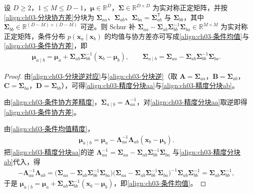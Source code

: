 \documentclass[../../main.tex]{subfiles}
\begin{document}
\begin{proposition}\label{proposition:ch03-条件Gauss协方差}
设 $D\geqslant2$，$1\leqslant M\leqslant D-1$，$\boldsymbol{\mu}\in\mathbb{R}^{D}$，$\boldsymbol{\Sigma}\in\mathbb{R}^{D\times D}$ 为实对称正定矩阵，并按\eqref{align:ch03-分块协方差}分块为 $\boldsymbol{\Sigma}_{aa}$、$\boldsymbol{\Sigma}_{ab}$、$\boldsymbol{\Sigma}_{ba}=\boldsymbol{\Sigma}_{ab}^{\mathsf{T}}$ 与 $\boldsymbol{\Sigma}_{bb}$，其中 $\boldsymbol{\Sigma}_{bb}\in\mathbb{R}^{(D-M)\times(D-M)}$ 可逆。则 Schur 补 $\boldsymbol{\Sigma}_{aa}-\boldsymbol{\Sigma}_{ab}\boldsymbol{\Sigma}_{bb}^{-1}\boldsymbol{\Sigma}_{ba}\in\mathbb{R}^{M\times M}$ 为实对称正定矩阵，条件分布 $p(\boldsymbol{x}_{a}\mid\boldsymbol{x}_{b})$ 的均值与协方差亦可写成\eqref{align:ch03-条件均值}与\eqref{align:ch03-条件协方差}，即
\begin{align*}
\boldsymbol{\mu}_{a\mid b}=\boldsymbol{\mu}_{a}+\boldsymbol{\Sigma}_{ab}\boldsymbol{\Sigma}_{bb}^{-1}(\boldsymbol{x}_{b}-\boldsymbol{\mu}_{b}),\qquad \boldsymbol{\Sigma}_{a\mid b}=\boldsymbol{\Sigma}_{aa}-\boldsymbol{\Sigma}_{ab}\boldsymbol{\Sigma}_{bb}^{-1}\boldsymbol{\Sigma}_{ba}.
\end{align*}
\end{proposition}
\begin{proof}
由\eqref{align:ch03-分块逆对应}与\eqref{align:ch03-分块逆}（取 $\boldsymbol{A}=\boldsymbol{\Sigma}_{aa}$，$\boldsymbol{B}=\boldsymbol{\Sigma}_{ab}$，$\boldsymbol{C}=\boldsymbol{\Sigma}_{ba}$，$\boldsymbol{D}=\boldsymbol{\Sigma}_{bb}$），可得\eqref{align:ch03-精度分块aa}与\eqref{align:ch03-精度分块ab}。

由\eqref{align:ch03-条件协方差精度}，$\boldsymbol{\Sigma}_{a\mid b}=\boldsymbol{\Lambda}_{aa}^{-1}$，对\eqref{align:ch03-精度分块aa}取逆即得\eqref{align:ch03-条件协方差}。

由\eqref{align:ch03-条件均值精度}，
\begin{align*}
\boldsymbol{\mu}_{a\mid b}=\boldsymbol{\mu}_{a}-\boldsymbol{\Lambda}_{aa}^{-1}\boldsymbol{\Lambda}_{ab}(\boldsymbol{x}_{b}-\boldsymbol{\mu}_{b}).
\end{align*}
把\eqref{align:ch03-精度分块aa}的逆 $\boldsymbol{\Lambda}_{aa}^{-1}=\boldsymbol{\Sigma}_{aa}-\boldsymbol{\Sigma}_{ab}\boldsymbol{\Sigma}_{bb}^{-1}\boldsymbol{\Sigma}_{ba}$ 与\eqref{align:ch03-精度分块ab}代入，得
\begin{align*}
-\boldsymbol{\Lambda}_{aa}^{-1}\boldsymbol{\Lambda}_{ab}=\bigl(\boldsymbol{\Sigma}_{aa}-\boldsymbol{\Sigma}_{ab}\boldsymbol{\Sigma}_{bb}^{-1}\boldsymbol{\Sigma}_{ba}\bigr)\bigl(\boldsymbol{\Sigma}_{aa}-\boldsymbol{\Sigma}_{ab}\boldsymbol{\Sigma}_{bb}^{-1}\boldsymbol{\Sigma}_{ba}\bigr)^{-1}\boldsymbol{\Sigma}_{ab}\boldsymbol{\Sigma}_{bb}^{-1}=\boldsymbol{\Sigma}_{ab}\boldsymbol{\Sigma}_{bb}^{-1},
\end{align*}
于是 $\boldsymbol{\mu}_{a\mid b}=\boldsymbol{\mu}_{a}+\boldsymbol{\Sigma}_{ab}\boldsymbol{\Sigma}_{bb}^{-1}(\boldsymbol{x}_{b}-\boldsymbol{\mu}_{b})$，即\eqref{align:ch03-条件均值}。
\end{proof}
\end{document}
